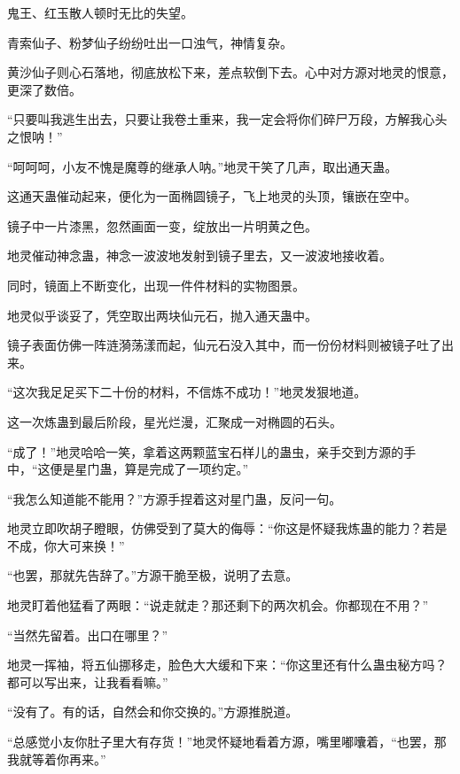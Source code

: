 
\begin{this_body}



鬼王、红玉散人顿时无比的失望。

青索仙子、粉梦仙子纷纷吐出一口浊气，神情复杂。

黄沙仙子则心石落地，彻底放松下来，差点软倒下去。心中对方源对地灵的恨意，更深了数倍。

“只要叫我逃生出去，只要让我卷土重来，我一定会将你们碎尸万段，方解我心头之恨呐！”

“呵呵呵，小友不愧是魔尊的继承人呐。”地灵干笑了几声，取出通天蛊。

这通天蛊催动起来，便化为一面椭圆镜子，飞上地灵的头顶，镶嵌在空中。

镜子中一片漆黑，忽然画面一变，绽放出一片明黄之色。

地灵催动神念蛊，神念一波波地发射到镜子里去，又一波波地接收着。

同时，镜面上不断变化，出现一件件材料的实物图景。

地灵似乎谈妥了，凭空取出两块仙元石，抛入通天蛊中。

镜子表面仿佛一阵涟漪荡漾而起，仙元石没入其中，而一份份材料则被镜子吐了出来。

“这次我足足买下二十份的材料，不信炼不成功！”地灵发狠地道。

这一次炼蛊到最后阶段，星光烂漫，汇聚成一对椭圆的石头。

“成了！”地灵哈哈一笑，拿着这两颗蓝宝石样儿的蛊虫，亲手交到方源的手中，“这便是星门蛊，算是完成了一项约定。”

“我怎么知道能不能用？”方源手捏着这对星门蛊，反问一句。

地灵立即吹胡子瞪眼，仿佛受到了莫大的侮辱：“你这是怀疑我炼蛊的能力？若是不成，你大可来换！”

“也罢，那就先告辞了。”方源干脆至极，说明了去意。

地灵盯着他猛看了两眼：“说走就走？那还剩下的两次机会。你都现在不用？”

“当然先留着。出口在哪里？”

地灵一挥袖，将五仙挪移走，脸色大大缓和下来：“你这里还有什么蛊虫秘方吗？都可以写出来，让我看看嘛。”

“没有了。有的话，自然会和你交换的。”方源推脱道。

“总感觉小友你肚子里大有存货！”地灵怀疑地看着方源，嘴里嘟囔着，“也罢，那我就等着你再来。”


\end{this_body}
